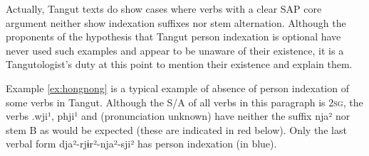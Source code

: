 \documentclass[oldfontcommands,oneside,a4paper,11pt]{article}
\newcommand{\ipa}[1]{{\phon \mbox{#1}}} %
\newcommand{\zh}[1]{{\cn #1}}
\newcommand{\tgf}[1]{\begin{tabular}{l}\mo{#1}\\{\tiny #1}\end{tabular}}
\begin{document}
 




Actually, Tangut texts do show cases where verbs with a clear SAP core argument neither show indexation suffixes nor stem alternation. Although the proponents of the hypothesis that Tangut person indexation is optional have never used such examples and appear to be unaware of their existence, it is a Tangutologist's duty at this point to mention their existence and explain them.

Example \ref{ex:hongnong} is a typical example of absence of person indexation of some verbs in Tangut. Although the S/A of all verbs in this paragraph is \textsc{2sg}, the verbs  \ipa{.wji¹},   \ipa{phji¹} and  (pronunciation unknown) have neither the suffix  \ipa{nja²} nor stem B as would be expected (these are indicated in red below). Only the last verbal form   \ipa{dja²}-\ipa{rjɨr²}-\ipa{nja²}-\ipa{sji²} has person indexation (in blue).
\end{document}
